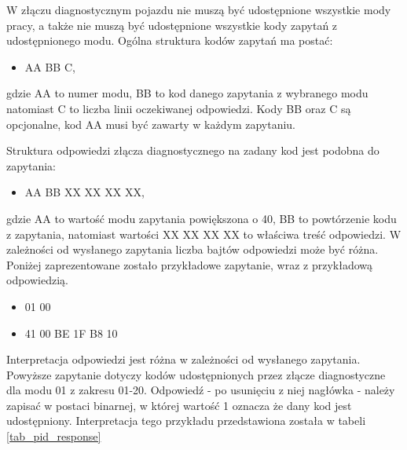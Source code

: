 \documentclass[12pt]{article} %
\numberwithin{equation}{subsection}
\numberwithin{figure}{section}
\numberwithin{table}{section}
\begin{document}
	

	W złączu diagnostycznym pojazdu nie muszą być udostępnione wszystkie mody pracy, a także nie muszą być udostępnione wszystkie kody zapytań z udostępnionego modu. Ogólna struktura kodów zapytań ma postać:

	\begin{itemize}
		\item{AA BB C,}
	\end{itemize}
		 gdzie AA to numer modu, BB to kod danego zapytania z wybranego modu natomiast C to liczba linii oczekiwanej odpowiedzi. Kody BB oraz C są opcjonalne, kod AA musi być zawarty w każdym zapytaniu. 
		 
		 Struktura odpowiedzi złącza diagnostycznego na zadany kod jest podobna do zapytania:
		
		\begin{itemize}
			\item{AA BB XX XX XX XX,}
		\end{itemize}		
		gdzie AA to wartość modu zapytania powiększona o 40, BB to powtórzenie kodu z zapytania, natomiast wartości XX XX XX XX to właściwa treść odpowiedzi. W zależności od wysłanego zapytania liczba bajtów odpowiedzi może być różna. Poniżej zaprezentowane zostało przykładowe zapytanie, wraz z przykładową odpowiedzią. 
		
		\begin{itemize}
			\item{01 00}
			\item{41 00 BE 1F B8 10}
		\end{itemize}
		
	\newpage		
		
		Interpretacja odpowiedzi jest różna w zależności od wysłanego zapytania. Powyższe zapytanie dotyczy kodów udostępnionych przez złącze diagnostyczne dla modu 01 z zakresu 01-20. Odpowiedź - po usunięciu z niej nagłówka - należy zapisać w postaci binarnej, w której wartość 1 oznacza że dany kod jest udostępniony. Interpretacja tego przykładu przedstawiona została w tabeli \ref{tab_pid_response}
		
\end{document}
